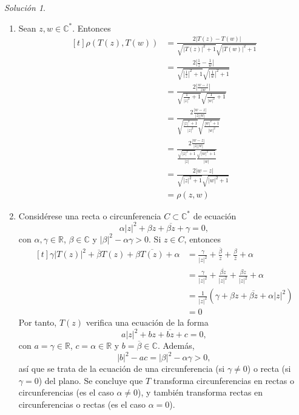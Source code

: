 \documentclass[11pt]{report}
\newcommand{\R}{\mathbb R}
\newcommand{\C}{\mathbb C}
\newcommand{\pars}[1]{\left( #1 \right)} %
\theoremstyle{remark}
\newtheorem*{resolution}{Solución}
\begin{document}
\pagebreak

\begin{resolution}
    \hfill
    \begin{enumerate}
        \item Sean $z,w \in \C^*$. Entonces
        \[
        \begin{aligned}[t]
        \rho(T(z),T(w)) &= \frac{2|T(z)-T(w)|}{\sqrt{|T(z)|^2+1}\sqrt{|T(w)|^2+1}} \\
        &= \frac{2|\frac{1}{z}-\frac{1}{w}|}{\sqrt{|\frac{1}{z}|^2+1}\sqrt{|\frac{1}{w}|^2+1}} \\
        &= \frac{2|\frac{w-z}{zw}|}{\sqrt{\frac{1}{|z|^2}+1}\sqrt{\frac{1}{|w|^2}+1}} \\
        &= \frac{2\frac{|w-z|}{|z||w|}}{\sqrt{\frac{|z|^2+1}{|z|^2}}\sqrt{\frac{|w|^2+1}{|w|^2}}} \\
        &= \frac{2\frac{|w-z|}{|z||w|}}{\frac{\sqrt{|z|^2+1}}{|z|}\frac{\sqrt{|w|^2+1}}{|w|}} \\
        &= \frac{2|w-z|}{\sqrt{|z|^2+1}\sqrt{|w|^2+1}} \\
        &= \rho(z,w)
        \end{aligned}
        \]
        \item Considérese una recta o circunferencia $C \subset \C^*$ de ecuación
        \[\alpha|z|^2+\beta z+\overline{\beta z}+\gamma = 0,\]
        con $\alpha,\gamma \in \R$, $\beta \in \C$ y $|\beta|^2-\alpha\gamma >0$. Si $z \in C$, entonces
        \[
        \begin{aligned}[t]
            \gamma|T(z)|^2+\overline{\beta} T(z)+\beta \overline{T(z)}+\alpha
            &= \frac{\gamma}{|z|^2}+\frac{\overline{\beta}}{z}+\frac{\beta}{\overline{z}}+\alpha \\ 
            &= \frac{\gamma}{|z|^2}+\frac{\overline{\beta z}}{|z|^2}+\frac{\beta z}{|z|^2}+\alpha \\
            &= \frac{1}{|z|^2}\pars{\gamma+\beta z+\overline{\beta z}+\alpha |z|^2} \\
            &= 0
        \end{aligned}
        \]
        Por tanto, $T(z)$ verifica una ecuación de la forma
        \[a|z|^2+bz+\overline{bz}+c = 0,\]
        con $a = \gamma \in \R$, $c = \alpha \in \R$ y $b = \overline{\beta} \in \C$. Además,
        \[|b|^2-ac = |\beta|^2-\alpha \gamma > 0,\]
        así que se trata de la ecuación de una circunferencia (si $\gamma \neq 0$) o recta (si $\gamma = 0$) del plano. Se concluye que $T$ transforma circunferencias en rectas o circunferencias (es el caso $\alpha \neq 0$), y también transforma rectas en circunferencias o rectas (es el caso $\alpha = 0$).
    \end{enumerate}
\end{resolution}
\end{document}
